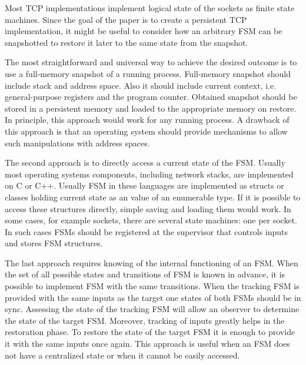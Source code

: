 Most TCP implementations implement logical state of the sockets as finite state
machines. Since the goal of the paper is to create a persistent TCP
implementation, it might be useful to consider how an arbitrary FSM can be
snapshotted to restore it later to the same state from the snapshot. 

The most straightforward and universal way to achieve the desired outcome is to
use a full-memory snapshot of a running process. Full-memory snapshot should
include stack and address space. Also it should include current context, i.e.
general-purpose registers and the program counter. Obtained snapshot should be
stored in a persistent memory and loaded to the appropriate memory on restore.
In principle, this approach would work for any running process. A drawback of
this approach is that an operating system should provide mechanisms to allow
such manipulations with address spaces.

The second approach is to directly access a current state of the FSM. Usually
most operating systems components, including network stacks, are implemented
on C or C++. Usually FSM in these languages are implemented as structs or
classes holding current state as an value of an enumerable type. If it is
possible to access these structures directly, simple saving and loading them
would work. In some cases, for example sockets, there are several state
machines: one per socket. In such cases FSMs should be registered at the
supervisor that controls inputs and stores FSM structures.

The last approach requires knowing of the internal functioning of an FSM. When
the set of all possible states and transitions of FSM is known in advance, it
is possible to implement FSM with the same transitions. When the tracking FSM
is provided with the same inputs as the target one states of both FSMs should
be in sync. Assessing the state of the tracking FSM will allow an observer to
determine the state of the target FSM.  Moreover, tracking of inputs greatly
helps in the restoration phase. To restore the state of the target FSM it is
enough to provide it with the same inputs once again. This approach is useful
when an FSM does not have a centralized state or when it cannot be easily
accessed.

